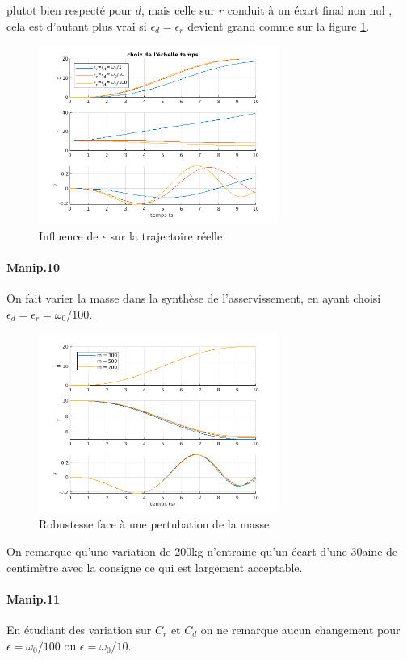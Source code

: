 \documentclass[10pt,a4paper,notitlepage]{article}
\begin{document}
plutot bien respecté pour $d$, mais celle sur $r$ conduit à un écart
final non nul , cela est d'autant plus vrai si $\epsilon_d=\epsilon_r$ devient grand comme sur la figure \ref{fig:eps}.
\begin{figure}[H]
  \centering
  \includegraphics[width=0.7\textwidth]{eps_choix}
  \caption{Influence de $\epsilon$ sur la trajectoire réelle}
  \label{fig:eps}
\end{figure}

\paragraph{Manip.10}
On fait varier la masse dans la synthèse de l'asservissement, en ayant choisi
$\epsilon_d=\epsilon_r= \omega_0/100$.
\begin{figure}[H]
  \centering
  \includegraphics[width=0.7\textwidth]{m_choix}
  \caption{Robustesse face à une pertubation de la masse}
  \label{fig:m_choix}
\end{figure}
On remarque qu'une variation de 200kg n'entraine qu'un écart d'une 30aine de
centimètre avec la consigne ce qui est largement acceptable.


\paragraph{Manip.11}
En étudiant des variation sur $C_r$ et $C_d$ on ne remarque aucun changement
pour $\epsilon = \omega_0/100$ ou  $\epsilon = \omega_0/10$.
\end{document}

